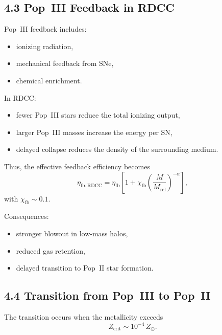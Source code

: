 \documentclass[11pt,a4paper]{article}
\begin{document}
\subsection*{4.3 Pop~III Feedback in RDCC}

Pop~III feedback includes:

\begin{itemize}
    \item ionizing radiation,
    \item mechanical feedback from SNe,
    \item chemical enrichment.
\end{itemize}

In RDCC:

\begin{itemize}
    \item fewer Pop~III stars reduce the total ionizing output,
    \item larger Pop~III masses increase the energy per SN,
    \item delayed collapse reduces the density of the surrounding medium.
\end{itemize}

Thus, the effective feedback efficiency becomes
\begin{equation}
    \eta_{\mathrm{fb,RDCC}}
    = \eta_{\mathrm{fb}}
      \left[
        1 + \chi_{\mathrm{fb}}
        \left(\frac{M}{M_{\mathrm{rel}}}\right)^{-\alpha}
      \right],
\end{equation}
with $\chi_{\mathrm{fb}} \sim 0.1$.

Consequences:

\begin{itemize}
    \item stronger blowout in low-mass halos,
    \item reduced gas retention,
    \item delayed transition to Pop~II star formation.
\end{itemize}

\subsection*{4.4 Transition from Pop~III to Pop~II}

The transition occurs when the metallicity exceeds
\begin{equation}
    Z_{\mathrm{crit}}
    \sim 10^{-4}\,Z_{\odot}.
\end{equation}
\end{document}
